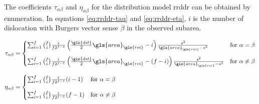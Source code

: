 %
%
%

%
%

\subsubsection{}

The coefficients \( \tau_{\alpha \beta} \) and \( \eta_{\alpha \beta} \) for the distribution model \gls{rrddr} can be obtained by enumeration.
In equations \eqref{eq:rrddr-tau} and \eqref{eq:rrddr-eta}, \( i \) is the number of dislocation with Burgers vector sense \( \beta \) in the observed subarea.

\begin{align}
  \tau_{\alpha \beta} &=
    \begin{cases}
      \sum_{i=1}^f \binom{f}{i} \frac{i}{f 2^{f-1}} \left( \frac{\gls{dst}}{2} \gls{area}_{\gls{roi}} - i \right) \frac{s^2}{\gls{area}_{\gls{roi}} - s^2} & \text{for } \alpha = \beta \\[4mm]
      \sum_{i=1}^f \binom{f}{i} \frac{i}{f 2^{f-1}} \left( \frac{\gls{dst}}{2} \gls{area}_{\gls{roi}} - (f - i) \right) \frac{s^2}{\gls{area}_{\gls{roi}} - s^2} & \text{for } \alpha \neq \beta
    \end{cases}
    \label{eq:rrddr-tau}
  \\[3mm]
  \eta_{\alpha \beta} &=
    \begin{cases}
      \sum_{i=1}^f \binom{f}{i} \frac{i}{f 2^{f-1}} (i - 1)
      & \text{for } \alpha = \beta \\[4mm]
      \sum_{i=1}^f \binom{f}{i} \frac{i}{f 2^{f-1}} (f - 1)
      & \text{for } \alpha \neq \beta
    \end{cases}
    \label{eq:rrddr-eta}
\end{align}

\medskip

